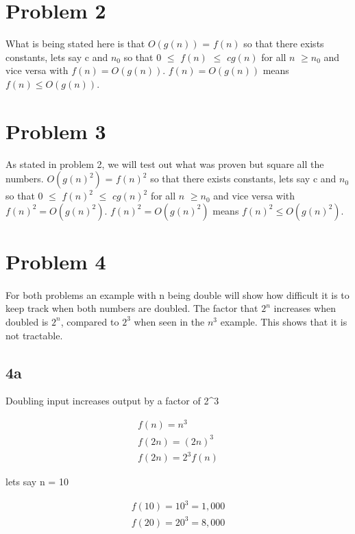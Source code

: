 \documentclass[letterpaper,oneside,10pt]{article}
\begin{document}
\section{Problem 2}
\label{sec:Problem 2}

\qquad What is being stated here is that \(O(g(n))\) = \(f(n)\) so that there exists constants, lets say c and \(n_{0}\) so that 0 \(\leq\) \(f(n)\) \(\leq\) \(cg(n)\) for all \(n\) \(\geq\)\(n_{0}\) and vice versa with \(f(n) = O(g(n))\).  \(f(n) = O(g(n))\) means \(f(n) \leq O(g(n))\).

\section{Problem 3}
\label{sec:Problem 3}
\qquad As stated in problem 2, we will test out what was proven but square all the numbers. \(O(g(n)^{2})\) = \(f(n)^{2}\) so that there exists constants, lets say c and \(n_{0}\) so that 0 \(\leq\) \(f(n)^{2}\) \(\leq\) \(cg(n)^2\) for all \(n\) \(\geq\)\(n_{0}\) and vice versa with \(f(n)^{2} = O(g(n)^{2})\). \(f(n)^{2} = O(g(n)^{2})\) means \(f(n)^{2} \leq O(g(n)^{2})\).

\section{Problem 4}
\paragraph{}
	For both problems an example with n being double will show how difficult it is to keep track when both numbers are doubled. The factor that \(2^{n}\) increases when doubled is \(2^{n}\), compared to \(2^{3}\) when seen in the \(n^{3}\) example. This shows that it is not tractable. 
\label{sec:Problem 4}
\subsection{4a}
\label{sec:4a}
\begin{center}
Doubling input increases output by a factor of 2^{3}
\end{center}
\begin{gather*}
f(n) = n^3 \\
f(2n) = (2n)^3 \\
f(2n) = 2^3f(n) 
\end{gather*}
\begin{center}
lets say n = 10
\end{center}
\begin{gather*}
f(10) = 10^3 = 1,000 \\
f(20) = 20^3 = 8,000
\end{gather*}
\end{document}
